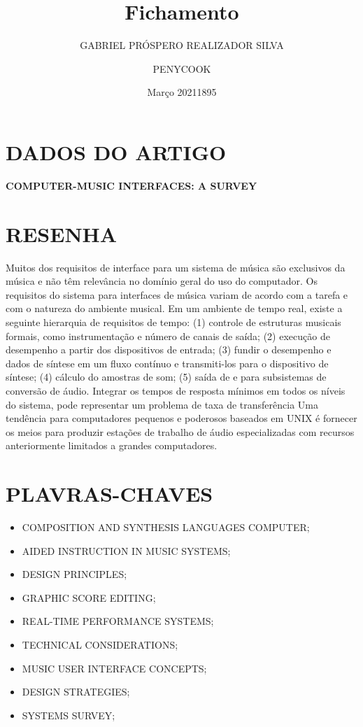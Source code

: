 \documentclass{article}
\title{Fichamento}
\author{GABRIEL PRÓSPERO REALIZADOR  SILVA}
\date{Março 2021}
\begin{document}
\maketitle

\section{DADOS DO ARTIGO}
\textbf{COMPUTER-MUSIC INTERFACES: A SURVEY \\}
\author{PENYCOOK \\}
\date{1895}

\section{RESENHA}
Muitos dos requisitos de interface para um sistema de música são exclusivos da música e não têm relevância no domínio geral do uso do computador. Os requisitos do sistema para interfaces de música variam de acordo com a tarefa e com o natureza do ambiente musical. Em um ambiente de tempo real, existe a seguinte hierarquia de requisitos de tempo: (1) controle de estruturas musicais formais, como instrumentação e número de canais de saída; (2) execução de desempenho a partir dos dispositivos de entrada; (3) fundir o desempenho e dados de síntese em um fluxo contínuo e transmiti-los para o dispositivo de síntese; (4) cálculo do amostras de som; (5) saída de e para subsistemas de conversão de áudio. Integrar os tempos de resposta mínimos em todos os níveis do sistema, pode representar um problema de taxa de transferência Uma tendência para computadores pequenos e poderosos baseados em UNIX é fornecer os meios para produzir estações de trabalho de áudio especializadas com recursos anteriormente limitados a grandes computadores.

\section{PLAVRAS-CHAVES}
\begin{itemize}
    \item COMPOSITION AND SYNTHESIS LANGUAGES COMPUTER; 
    \item AIDED INSTRUCTION IN MUSIC SYSTEMS; 
    \item DESIGN PRINCIPLES; 
    \item GRAPHIC SCORE EDITING; 
    \item REAL-TIME PERFORMANCE SYSTEMS; 
    \item TECHNICAL CONSIDERATIONS; 
    \item MUSIC USER INTERFACE CONCEPTS; 
    \item DESIGN STRATEGIES; 
    \item SYSTEMS SURVEY;
\end{itemize}
\end{document}

